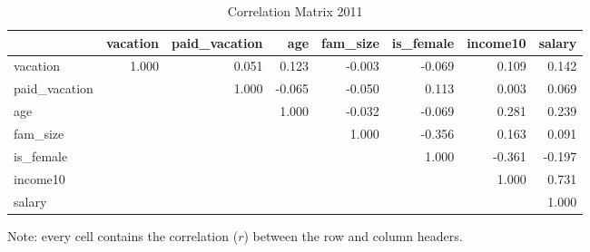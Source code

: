 \documentclass{article}
\begin{document}
    \begin{table}[h]
    \centering
    \hspace*{-1.5cm}
    \begin{tabular}{l|r|r|r|r|r|r|r}
                     & vacation & paid\_vacation &    age & fam\_size & is\_female & income10 & salary \\ \hline
      vacation       &    1.000 &          0.051 &  0.123 &    -0.003 &     -0.069 &    0.109 &  0.142 \\ \hline
      paid\_vacation &          &          1.000 & -0.065 &    -0.050 &      0.113 &    0.003 &  0.069 \\ \hline
      age            &          &                &  1.000 &    -0.032 &     -0.069 &    0.281 &  0.239 \\ \hline
      fam\_size      &          &                &        &     1.000 &     -0.356 &    0.163 &  0.091 \\ \hline
      is\_female     &          &                &        &           &      1.000 &   -0.361 & -0.197 \\ \hline
      income10       &          &                &        &           &            &    1.000 &  0.731 \\ \hline
      salary         &          &                &        &           &            &          &  1.000
    \end{tabular}
    \hspace*{-1.5cm}
    \caption{Correlation Matrix 2011}
    \label{2011-correlation}
      Note: every cell contains the correlation ($r$) between the row and column headers.
    \end{table}
\end{document}
